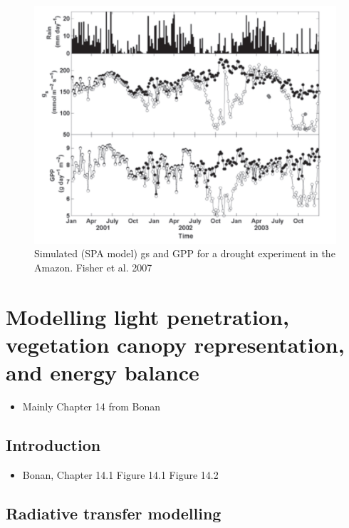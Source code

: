 \documentclass[
  oneside]{book}
\providecommand{\tightlist}{%
  \setlength{\itemsep}{0pt}\setlength{\parskip}{0pt}}
\begin{document}
\begin{figure}

{\centering \includegraphics[width=0.8\linewidth]{figures/chap2/fisher2} 

}

\caption{Simulated (SPA model) gs and GPP for a drought experiment in the Amazon. Fisher et al. 2007}\label{fig:f225}
\end{figure}

\hypertarget{modelling-light-penetration-vegetation-canopy-representation-and-energy-balance}{%
\chapter{Modelling light penetration, vegetation canopy representation, and energy balance}\label{modelling-light-penetration-vegetation-canopy-representation-and-energy-balance}}


\begin{itemize}
\tightlist
\item
  Mainly Chapter 14 from Bonan
\end{itemize}

\hypertarget{introduction}{%
\section{Introduction}\label{introduction}}

\begin{itemize}
\tightlist
\item
  Bonan, Chapter 14.1
  Figure 14.1
  Figure 14.2
\end{itemize}

\hypertarget{radiative-transfer-modelling}{%
\section{Radiative transfer modelling}\label{radiative-transfer-modelling}}
\end{document}
